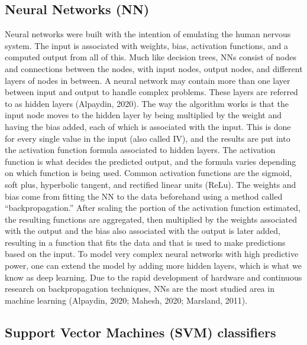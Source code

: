 \documentclass[
  man]{apa7}
\begin{document}
\hypertarget{neural-networks-nn}{%
\subsection{Neural Networks (NN)}\label{neural-networks-nn}}

Neural networks were built with the intention of emulating the human nervous system. The input is associated with weights, bias, activation functions, and a computed output from all of this. Much like decision trees, NNs consist of nodes and connections between the nodes, with input nodes, output nodes, and different layers of nodes in between. A neural network may contain more than one layer between input and output to handle complex problems. These layers are referred to as hidden layers (Alpaydin, 2020).
The way the algorithm works is that the input node moves to the hidden layer by being multiplied by the weight and having the bias added, each of which is associated with the input. This is done for every single value in the input (also called IV), and the results are put into the activation function formula associated to hidden layers. The activation function is what decides the predicted output, and the formula varies depending on which function is being used. Common activation functions are the sigmoid, soft plus, hyperbolic tangent, and rectified linear units (ReLu). The weights and bias come from fitting the NN to the data beforehand using a method called ``backpropagation.'' After scaling the portion of the activation function estimated, the resulting functions are aggregated, then multiplied by the weights associated with the output and the bias also associated with the output is later added, resulting in a function that fits the data and that is used to make predictions based on the input.
To model very complex neural networks with high predictive power, one can extend the model by adding more hidden layers, which is what we know as deep learning. Due to the rapid development of hardware and continuous research on backpropagation techniques, NNs are the most studied area in machine learning (Alpaydin, 2020; Mahesh, 2020; Marsland, 2011).

\hypertarget{support-vector-machines-svm-classifiers}{%
\subsection{Support Vector Machines (SVM) classifiers}\label{support-vector-machines-svm-classifiers}}
\end{document}
